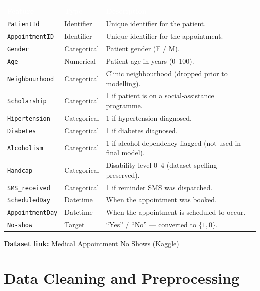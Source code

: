 \documentclass[11pt,a4paper]{article}
\newcommand{\hdrrow}[1]{\textcolor{white}{\textbf{#1}}}
\newcommand{\hdrline}{\rowcolor{navy}}
\begin{document}
\vspace{8pt}
\begin{tabularx}{\textwidth}{|>{\hsize=0.34\hsize}X|>{\hsize=0.22\hsize}X|X|}
\hline
\hdrline \hdrrow{Feature} & \hdrrow{Type} & \hdrrow{Description} \\ \hline
\texttt{PatientId}        & Identifier  & Unique identifier for the patient. \\ \hline
\texttt{AppointmentID}    & Identifier  & Unique identifier for the appointment. \\ \hline
\texttt{Gender}           & Categorical & Patient gender (F / M). \\ \hline
\texttt{Age}              & Numerical   & Patient age in years (0--100). \\ \hline
\texttt{Neighbourhood}    & Categorical & Clinic neighbourhood (dropped prior to modelling). \\ \hline
\texttt{Scholarship}      & Categorical & 1 if patient is on a social-assistance programme. \\ \hline
\texttt{Hipertension}     & Categorical & 1 if hypertension diagnosed. \\ \hline
\texttt{Diabetes}         & Categorical & 1 if diabetes diagnosed. \\ \hline
\texttt{Alcoholism}       & Categorical & 1 if alcohol-dependency flagged (not used in final model). \\ \hline
\texttt{Handcap}          & Categorical & Disability level 0--4 (dataset spelling preserved). \\ \hline
\texttt{SMS\_received}    & Categorical & 1 if reminder SMS was dispatched. \\ \hline
\texttt{ScheduledDay}     & Datetime    & When the appointment was booked. \\ \hline
\texttt{AppointmentDay}   & Datetime    & When the appointment is scheduled to occur. \\ \hline
\texttt{No-show}          & Target      & ``Yes'' / ``No'' --- converted to $\{1,0\}$. \\ \hline
\end{tabularx}

\vspace{6pt}
\textbf{Dataset link:}
\href{https://www.kaggle.com/datasets/joniarroba/noshowappointments}{Medical Appointment No Shows (Kaggle)}

\section{Data Cleaning and Preprocessing}
\end{document}
